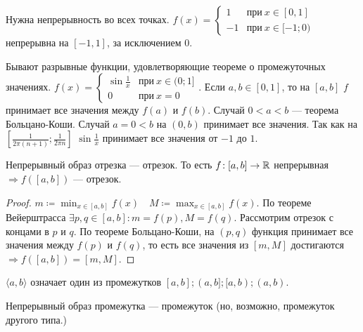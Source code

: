 \begin{remark}
    Нужна непрерывность во всех точках. $f(x) = \begin{cases} 1 & \text{при}\ x \in [0, 1] \\ -1 & \text{при}\ x \in [-1;0) \end{cases}$ непрерывна на $[-1, 1]$, за исключением 0.
\end{remark}
\begin{remark}
    Бывают разрывные функции, удовлетворяющие теореме о промежуточных значениях. $f(x) = \begin{cases} \sin \frac{1}{x} & \text{при}\ x \in (0; 1] \\ 0 & \text{при}\ x = 0\end{cases}$. Если $a, b \in [0, 1]$, то на  $[a, b]$  $f$ принимает все значения между  $f(a)$ и  $f(b)$. Случай  $0 < a < b$ --- теорема Больцано-Коши. Случай  $a=0 < b$ на  $(0, b)$ принимает все значения. Так как на $[\frac{1}{2\pi(n+1)}; \frac{1}{2\pi n}]$ $\sin \frac{1}{x}$  принимает все значения от $-1$ до  $1$.
\end{remark}
\begin{theorem}
    Непрерывный образ отрезка --- отрезок. То есть $f\!: [a, b] \to \mathbb{R}$ непрерывная $\Rightarrow f([a, b])$ --- отрезок. 
\end{theorem}
\begin{proof}
    $\displaystyle m \coloneqq \min_{x \in [a, b]}f(x) \quad M \coloneqq \max_{x \in [a, b]}f(x)$. По теореме Вейерштрасса $\exists p, q \in [a, b]\!: m = f(p), M = f(q)$. Рассмотрим отрезок с концами в $p$ и  $q$. По теореме Больцано-Коши, на  $(p, q)$ функция принимает все значения между  $f(p)$ и  $f(q)$, то есть все значения из $[m, M]$ достигаются  $\Rightarrow f([a, b]) = [m, M]$.
\end{proof}
\begin{definition}
    $\langle a, b \rangle$ означает один из промежутков  $[a, b]; (a, b]; [a, b); (a, b)$.
\end{definition}
\begin{theorem}
    Непрерывный образ промежутка --- промежуток (но, возможно, промежуток другого типа.)
\end{theorem}
